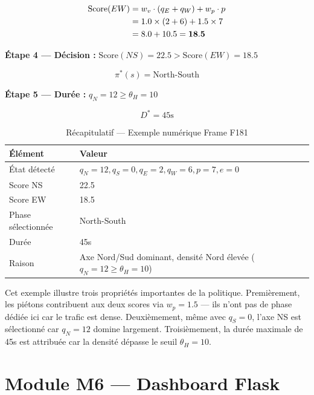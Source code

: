 \begin{align}
\text{Score}(EW) &= w_v \cdot (q_E + q_W)
+ w_p \cdot p \notag \\
&= 1.0 \times (2 + 6)
+ 1.5 \times 7 \notag \\
&= 8.0 + 10.5 = \mathbf{18.5}
\label{eq:score_ew_exemple}
\end{align}

\textbf{Étape 4 — Décision :}
$\text{Score}(NS) = 22.5 >
\text{Score}(EW) = 18.5$

\begin{equation}
\pi^*(s) = \text{North-South}
\label{eq:decision_exemple}
\end{equation}

\textbf{Étape 5 — Durée :}
$q_N = 12 \geq \theta_H = 10$

\begin{equation}
D^* = 45\text{s}
\label{eq:duree_exemple}
\end{equation}

\begin{table}[H]
\centering
\caption{Récapitulatif — Exemple numérique
         Frame F181}
\begin{tabularx}{\textwidth}{lX}
\toprule
\textbf{Élément} & \textbf{Valeur} \\
\midrule
État détecté &
$q_N=12, q_S=0, q_E=2, q_W=6,
p=7, e=0$ \\
Score NS & 22.5 \\
Score EW & 18.5 \\
Phase sélectionnée & North-South \\
Durée & 45s \\
Raison & Axe Nord/Sud dominant,
densité Nord élevée ($q_N=12
\geq \theta_H=10$) \\
\bottomrule
\end{tabularx}
\label{tab:exemple_numerique_mdp}
\end{table}

Cet exemple illustre trois propriétés
importantes de la politique. Premièrement,
les piétons contribuent aux deux scores
via $w_p = 1.5$ — ils n'ont pas de phase
dédiée ici car le trafic est dense.
Deuxièmement, même avec $q_S = 0$, l'axe
NS est sélectionné car $q_N = 12$ domine
largement. Troisièmement, la durée maximale
de 45s est attribuée car la densité dépasse
le seuil $\theta_H = 10$.


\section{Module M6 — Dashboard Flask}

